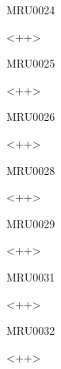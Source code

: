 \documentclass{article}
\begin{document}
\begin{corrige}{MRU0024}

<++>

\end{corrige}%


\begin{corrige}{MRU0025}

<++>

\end{corrige}%


\begin{corrige}{MRU0026}

<++>

\end{corrige}%




\begin{corrige}{MRU0028}

<++>

\end{corrige}%


\begin{corrige}{MRU0029}

<++>

\end{corrige}%




\begin{corrige}{MRU0031}

<++>

\end{corrige}\begin{corrige}{MRU0032}

<++>

\end{corrige}%
\end{document}
